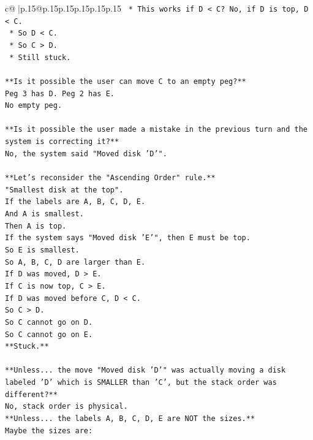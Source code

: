 \documentclass{article}
\begin{document}
{\begin{supertabular}{c@{$\;$}|p{.15\linewidth}@{}p{.15\linewidth}p{.15\linewidth}p{.15\linewidth}p{.15\linewidth}p{.15\linewidth}}
{{{\texttt{    *   This works if D < C? No, if D is top, D < C.} \\
\texttt{    *   So D < C.} \\
\texttt{    *   So C > D.} \\
\texttt{    *   Still stuck.} \\
\\ 
\texttt{**Is it possible the user can move C to an empty peg?**} \\
\texttt{Peg 3 has D. Peg 2 has E.} \\
\texttt{No empty peg.} \\
\\ 
\texttt{**Is it possible the user made a mistake in the previous turn and the system is correcting it?**} \\
\texttt{No, the system said "Moved disk 'D'".} \\
\\ 
\texttt{**Let's reconsider the "Ascending Order" rule.**} \\
\texttt{"Smallest disk at the top".} \\
\texttt{If the labels are A, B, C, D, E.} \\
\texttt{And A is smallest.} \\
\texttt{Then A is top.} \\
\texttt{If the system says "Moved disk 'E'", then E must be top.} \\
\texttt{So E is smallest.} \\
\texttt{So A, B, C, D are larger than E.} \\
\texttt{If D was moved, D > E.} \\
\texttt{If C is now top, C > E.} \\
\texttt{If D was moved before C, D < C.} \\
\texttt{So C > D.} \\
\texttt{So C cannot go on D.} \\
\texttt{So C cannot go on E.} \\
\texttt{**Stuck.**} \\
\\ 
\texttt{**Unless... the move "Moved disk 'D'" was actually moving a disk labeled 'D' which is SMALLER than 'C', but the stack order was different?**} \\
\texttt{No, stack order is physical.} \\
\texttt{**Unless... the labels A, B, C, D, E are NOT the sizes.**} \\
\texttt{Maybe the sizes are:} \\
}}}
\end{supertabular}}
\end{document}
